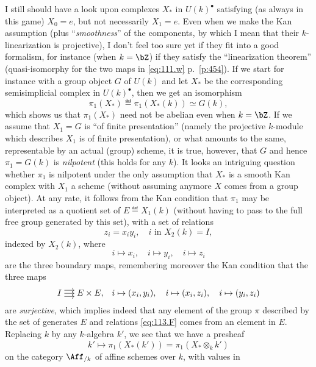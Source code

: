 I still should have a look upon complexes $X_*$ in $U(k)^\bullet$
satisfying (as always in this game) $X_0=e$, but not necessarily
$X_1=e$. Even when we make the Kan assumption (plus
``\emph{smoothness}'' of the components, by which I mean that their
$k$-linearization is projective), I don't feel too sure yet if they
fit into a good formalism, for instance (when $k=\bZ$) if they satisfy
the ``linearization theorem'' (quasi-isomorphy for the two maps in
\eqref{eq:111.w} p.~\ref{p:454}). If we start for instance with a
group object $G$ of $U(k)$ and let $X_*$ be the corresponding
semisimplicial complex in $U(k)^\bullet$, then we get an isomorphism
\begin{equation}
  \label{eq:113.E}
  \pi_1(X_*) \eqdef \pi_1(X_*(k)) \simeq G(k),\tag{E}
\end{equation}
which shows us that $\pi_1(X_*)$ need not be abelian even when
$k=\bZ$. If we assume that $X_1=G$ is ``of finite presentation''
(namely the projective $k$-module which describes $X_1$ is of finite
presentation), or what amounts to the same, representable by an actual
(group) scheme, it is true, however, that $G$ and hence $\pi_1=G(k)$
is \emph{nilpotent} (this holds for any $k$). It looks an intriguing
question whether $\pi_1$ is nilpotent under the only assumption that
$X_*$ is a smooth Kan complex with $X_1$ a scheme (without assuming
anymore $X$ comes from a group object). At any rate, it follows
from the Kan condition that $\pi_1$ may be interpreted as
a quotient set of $E \eqdef X_1(k)$ (without having to pass to the
full free group generated by this set), with a set of relations
\begin{equation}
  \label{eq:113.F}
  z_i = x_iy_i, \quad \text{$i$ in $X_2(k)=I$},\tag{F}
\end{equation}
indexed by $X_2(k)$, where
\[i\mapsto x_i, \quad i\mapsto y_i, \quad i\mapsto z_i\]
are the three boundary maps, remembering moreover the Kan condition
that the three maps
\[\begin{tikzcd}[cramped,sep=small]
  I\ar[r]\ar[r,shift left=1.5]\ar[r,shift right=1.5] & E\times E,
\end{tikzcd}\quad
i\mapsto(x_i,y_i), \quad i\mapsto(x_i,z_i),\quad i\mapsto(y_i,z_i)\]
are \emph{surjective}, which implies indeed that any element of the
group $\pi$ described by the set of generates $E$ and relations
\eqref{eq:113.F} comes from an element in $E$. Replacing $k$ by any
$k$-algebra $k'$, we see that we have a presheaf
\[k' \mapsto \pi_1(X_*(k')) = \pi_1(X_*\otimes_k k')\]
on the category $\Aff_{/k}$ of affine schemes over $k$, with values in
